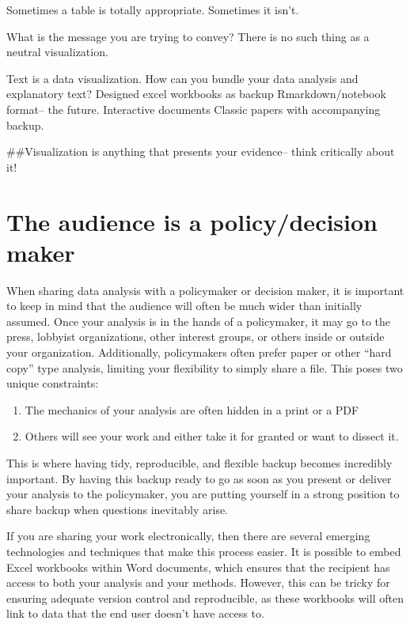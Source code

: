 \documentclass[]{book}
\providecommand{\tightlist}{%
  \setlength{\itemsep}{0pt}\setlength{\parskip}{0pt}}
\begin{document}
Sometimes a table is totally appropriate. Sometimes it isn't.

What is the message you are trying to convey? There is no such thing as a neutral visualization.

Text is a data visualization. How can you bundle your data analysis and explanatory text?
Designed excel workbooks as backup
Rmarkdown/notebook format-- the future.
Interactive documents
Classic papers with accompanying backup.

\#\#Visualization is anything that presents your evidence-- think critically about it!

\hypertarget{the-audience-is-a-policydecision-maker}{%
\section{The audience is a policy/decision maker}\label{the-audience-is-a-policydecision-maker}}

When sharing data analysis with a policymaker or decision maker, it is important to keep in mind that the audience will often be much wider than initially assumed. Once your analysis is in the hands of a policymaker, it may go to the press, lobbyist organizations, other interest groups, or others inside or outside your organization. Additionally, policymakers often prefer paper or other ``hard copy'' type analysis, limiting your flexibility to simply share a file. This poses two unique constraints:

\begin{enumerate}
\def\labelenumi{\arabic{enumi})}
\tightlist
\item
  The mechanics of your analysis are often hidden in a print or a PDF
\item
  Others will see your work and either take it for granted or want to dissect it.
\end{enumerate}

This is where having tidy, reproducible, and flexible backup becomes incredibly important. By having this backup ready to go as soon as you present or deliver your analysis to the policymaker, you are putting yourself in a strong position to share backup when questions inevitably arise.

If you are sharing your work electronically, then there are several emerging technologies and techniques that make this process easier. It is possible to embed Excel workbooks within Word documents, which ensures that the recipient has access to both your analysis and your methods. However, this can be tricky for ensuring adequate version control and reproducible, as these workbooks will often link to data that the end user doesn't have access to.
\end{document}
